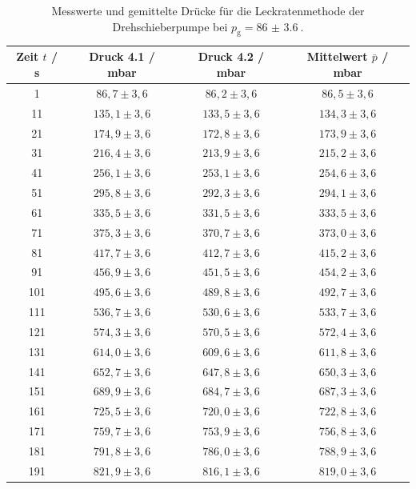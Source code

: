 \begin{table}[H]
\centering
\caption{Messwerte und gemittelte Drücke für die Leckratenmethode der Drehschieberpumpe bei $p_{\text{g}} = \qty{86(3.6)}{}$.}
\label{tab:14}
\begin{tabular}{cccc}
\toprule
Zeit $t$ / s & Druck 4.1 / mbar & Druck 4.2 / mbar & Mittelwert $\bar{p}$ / mbar \\
\midrule
1   & $86{,}7 \pm 3{,}6$  & $86{,}2 \pm 3{,}6$  & $86{,}5 \pm 3{,}6$ \\
11  & $135{,}1 \pm 3{,}6$ & $133{,}5 \pm 3{,}6$ & $134{,}3 \pm 3{,}6$ \\
21  & $174{,}9 \pm 3{,}6$ & $172{,}8 \pm 3{,}6$ & $173{,}9 \pm 3{,}6$ \\
31  & $216{,}4 \pm 3{,}6$ & $213{,}9 \pm 3{,}6$ & $215{,}2 \pm 3{,}6$ \\
41  & $256{,}1 \pm 3{,}6$ & $253{,}1 \pm 3{,}6$ & $254{,}6 \pm 3{,}6$ \\
51  & $295{,}8 \pm 3{,}6$ & $292{,}3 \pm 3{,}6$ & $294{,}1 \pm 3{,}6$ \\
61  & $335{,}5 \pm 3{,}6$ & $331{,}5 \pm 3{,}6$ & $333{,}5 \pm 3{,}6$ \\
71  & $375{,}3 \pm 3{,}6$ & $370{,}7 \pm 3{,}6$ & $373{,}0 \pm 3{,}6$ \\
81  & $417{,}7 \pm 3{,}6$ & $412{,}7 \pm 3{,}6$ & $415{,}2 \pm 3{,}6$ \\
91  & $456{,}9 \pm 3{,}6$ & $451{,}5 \pm 3{,}6$ & $454{,}2 \pm 3{,}6$ \\
101 & $495{,}6 \pm 3{,}6$ & $489{,}8 \pm 3{,}6$ & $492{,}7 \pm 3{,}6$ \\
111 & $536{,}7 \pm 3{,}6$ & $530{,}6 \pm 3{,}6$ & $533{,}7 \pm 3{,}6$ \\
121 & $574{,}3 \pm 3{,}6$ & $570{,}5 \pm 3{,}6$ & $572{,}4 \pm 3{,}6$ \\
131 & $614{,}0 \pm 3{,}6$ & $609{,}6 \pm 3{,}6$ & $611{,}8 \pm 3{,}6$ \\
141 & $652{,}7 \pm 3{,}6$ & $647{,}8 \pm 3{,}6$ & $650{,}3 \pm 3{,}6$ \\
151 & $689{,}9 \pm 3{,}6$ & $684{,}7 \pm 3{,}6$ & $687{,}3 \pm 3{,}6$ \\
161 & $725{,}5 \pm 3{,}6$ & $720{,}0 \pm 3{,}6$ & $722{,}8 \pm 3{,}6$ \\
171 & $759{,}7 \pm 3{,}6$ & $753{,}9 \pm 3{,}6$ & $756{,}8 \pm 3{,}6$ \\
181 & $791{,}8 \pm 3{,}6$ & $786{,}0 \pm 3{,}6$ & $788{,}9 \pm 3{,}6$ \\
191 & $821{,}9 \pm 3{,}6$ & $816{,}1 \pm 3{,}6$ & $819{,}0 \pm 3{,}6$ \\
\bottomrule
\end{tabular}
\end{table}

